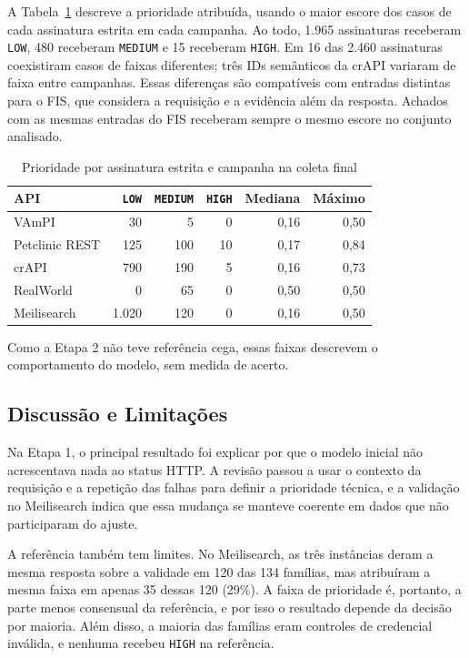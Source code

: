 A Tabela~\ref{tab:prioridade-final} descreve a prioridade atribuída, usando o
maior escore dos casos de cada assinatura estrita em cada campanha. Ao todo,
1.965 assinaturas receberam \texttt{LOW}, 480 receberam \texttt{MEDIUM} e 15
receberam \texttt{HIGH}. Em 16 das 2.460 assinaturas coexistiram casos de faixas
diferentes; três IDs semânticos da crAPI variaram de faixa entre campanhas.
Essas diferenças são compatíveis com entradas distintas para o FIS, que
considera a requisição e a evidência além da resposta. Achados com as mesmas
entradas do FIS receberam sempre o mesmo escore no conjunto analisado.

\begin{table}[H]
\centering
\caption{Prioridade por assinatura estrita e campanha na coleta final}
\label{tab:prioridade-final}
\small
\begin{tabular}{|l|r|r|r|r|r|}
\hline
\textbf{API} & \texttt{LOW} & \texttt{MEDIUM} & \texttt{HIGH} & \textbf{Mediana} & \textbf{Máximo} \\ \hline
VAmPI & 30 & 5 & 0 & 0,16 & 0,50 \\ \hline
Petclinic REST & 125 & 100 & 10 & 0,17 & 0,84 \\ \hline
crAPI & 790 & 190 & 5 & 0,16 & 0,73 \\ \hline
RealWorld & 0 & 65 & 0 & 0,50 & 0,50 \\ \hline
Meilisearch & 1.020 & 120 & 0 & 0,16 & 0,50 \\ \hline
\end{tabular}
\end{table}

Como a Etapa 2 não teve referência cega, essas faixas descrevem o
comportamento do modelo, sem medida de acerto.

\subsection{Discussão e Limitações}

Na Etapa 1, o principal resultado foi explicar por que o modelo inicial não
acrescentava nada ao status HTTP. A revisão passou a usar o contexto da
requisição e a repetição das falhas para definir a prioridade técnica, e a
validação no Meilisearch indica que essa mudança se manteve coerente em dados
que não participaram do ajuste.

A referência também tem limites. No Meilisearch, as três instâncias deram a
mesma resposta sobre a validade em 120 das 134 famílias, mas atribuíram a
mesma faixa em apenas 35 dessas 120 (29\%). A faixa de prioridade é, portanto,
a parte menos consensual da referência, e por isso o resultado depende da
decisão por maioria. Além disso, a maioria das famílias eram controles de
credencial inválida, e nenhuma recebeu \texttt{HIGH} na referência.

